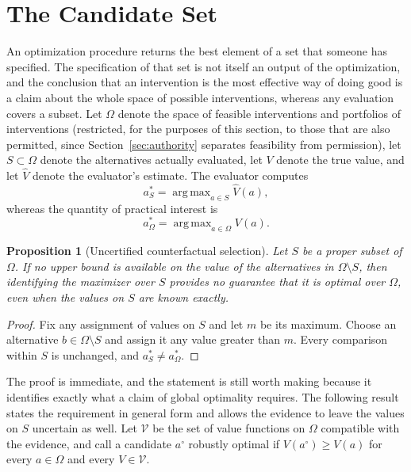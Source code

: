 \documentclass[11pt]{article}
\newtheorem{proposition}{Proposition}
\theoremstyle{definition}
\theoremstyle{remark}
\DeclareMathOperator*{\argmax}{arg\,max}
\begin{document}
\section{The Candidate Set}
\label{sec:candidate}

An optimization procedure returns the best element of a set that someone has specified. The specification of that set is not itself an output of the optimization, and the conclusion that an intervention is the most effective way of doing good is a claim about the whole space of possible interventions, whereas any evaluation covers a subset. Let $\Omega$ denote the space of feasible interventions and portfolios of interventions (restricted, for the purposes of this section, to those that are also permitted, since Section~\ref{sec:authority} separates feasibility from permission), let $S\subset\Omega$ denote the alternatives actually evaluated, let $V$ denote the true value, and let $\widehat V$ denote the evaluator's estimate. The evaluator computes
\begin{equation}
a_S^{*}=\argmax_{a\in S}\widehat V(a),
\label{eq:aS}
\end{equation}
whereas the quantity of practical interest is
\begin{equation}
a_\Omega^{*}=\argmax_{a\in\Omega}V(a).
\label{eq:aOmega}
\end{equation}

\begin{proposition}[Uncertified counterfactual selection]
\label{prop:uncertified}
Let $S$ be a proper subset of $\Omega$. If no upper bound is available on the value of the alternatives in $\Omega\setminus S$, then identifying the maximizer over $S$ provides no guarantee that it is optimal over $\Omega$, even when the values on $S$ are known exactly.
\end{proposition}

\begin{proof}
Fix any assignment of values on $S$ and let $m$ be its maximum. Choose an alternative $b\in\Omega\setminus S$ and assign it any value greater than $m$. Every comparison within $S$ is unchanged, and $a_S^{*}\neq a_\Omega^{*}$.
\end{proof}

The proof is immediate, and the statement is still worth making because it identifies exactly what a claim of global optimality requires. The following result states the requirement in general form and allows the evidence to leave the values on $S$ uncertain as well. Let $\mathcal V$ be the set of value functions on $\Omega$ compatible with the evidence, and call a candidate $a^{\circ}$ robustly optimal if $V(a^{\circ})\ge V(a)$ for every $a\in\Omega$ and every $V\in\mathcal V$.
\end{document}

